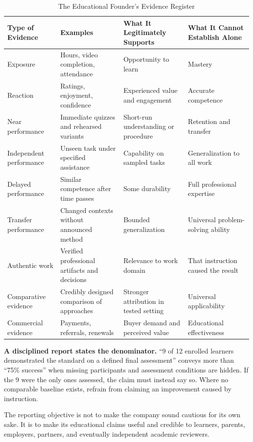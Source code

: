 \begin{table}[t]
\centering
\small
\caption{The Educational Founder's Evidence Register}
\begin{tabularx}{\textwidth}{p{}p{}p{}X}
\toprule
\textbf{Type of Evidence} & \textbf{Examples} & \textbf{What It Legitimately Supports} & \textbf{What It Cannot Establish Alone} \\
\midrule
Exposure & Hours, video completion, attendance & Opportunity to learn & Mastery \\
Reaction & Ratings, enjoyment, confidence & Experienced value and engagement & Accurate competence \\
Near performance & Immediate quizzes and rehearsed variants & Short-run understanding or procedure & Retention and transfer \\
Independent performance & Unseen task under specified assistance & Capability on sampled tasks & Generalization to all work \\
Delayed performance & Similar competence after time passes & Some durability & Full professional expertise \\
Transfer performance & Changed contexts without announced method & Bounded generalization & Universal problem-solving ability \\
Authentic work & Verified professional artifacts and decisions & Relevance to work domain & That instruction caused the result \\
Comparative evidence & Credibly designed comparison of approaches & Stronger attribution in tested setting & Universal applicability \\
Commercial evidence & Payments, referrals, renewals & Buyer demand and perceived value & Educational effectiveness \\
\bottomrule
\end{tabularx}
\end{table}

\textbf{A disciplined report states the denominator.} ``9 of 12 enrolled learners demonstrated the standard on a defined final assessment'' conveys more than ``75\% success'' when missing participants and assessment conditions are hidden. If the 9 were the only ones assessed, the claim must instead say so. Where no comparable baseline exists, refrain from claiming an improvement caused by instruction.

The reporting objective is not to make the company sound cautious for its own sake. It is to make its educational claims useful and credible to learners, parents, employers, partners, and eventually independent academic reviewers.

